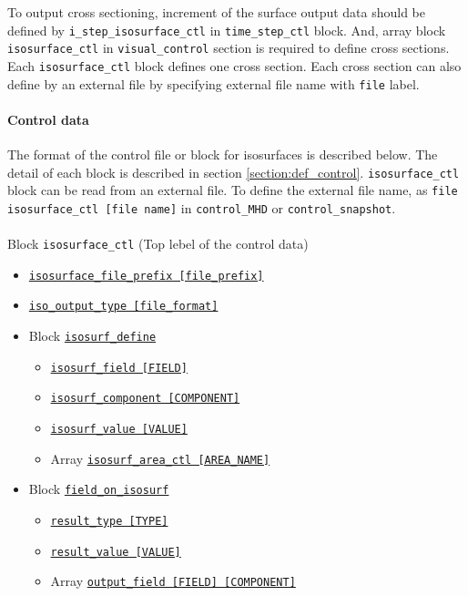 To output cross sectioning, increment of the surface output data should be defined by \verb|i_step_isosurface_ctl| in \verb|time_step_ctl| block. And, array block \verb|isosurface_ctl| in \verb|visual_control| section is required to define cross sections. Each \verb|isosurface_ctl| block defines one cross section. Each cross section can also define by an external file by specifying external file name with \verb|file| label.
%
\paragraph{Control data}  \label{section:isosurface_control}
The format of the control file or block for isosurfaces is described below. The detail of each block is described in section \ref{section:def_control}.  \verb|isosurface_ctl| block can be read from an external file. To define the external file name, as \verb|file isosurface_ctl [file name]| in \verb|control_MHD| or \verb|control_snapshot|. \\
\\
%
Block \verb|isosurface_ctl|  (Top lebel of the control data)
\label{href_i:isosurface_ctl}
\begin{itemize}
	\item \hyperref[href_t:isosurface_file_prefix]
			{\tt isosurface\_file\_prefix    [file\_prefix]}
	\item \hyperref[href_t:iso_output_type]
			{\tt iso\_output\_type           [file\_format]}
%
	\item Block \hyperref[href_t:isosurf_define]{\tt isosurf\_define}
		\begin{itemize}
			\item \hyperref[href_t:isosurf_field]{\tt isosurf\_field    [FIELD]}
			\item \hyperref[href_t:isosurf_component]
						{\tt isosurf\_component    [COMPONENT]}
			\item \hyperref[href_t:isosurf_value]{\tt isosurf\_value    [VALUE]}
%
			\item Array \hyperref[href_t:isosurf_area_ctl]
						{\tt isosurf\_area\_ctl  [AREA\_NAME]}
		\end{itemize}
%
	\item Block \hyperref[href_t:field_on_isosurf]{\tt field\_on\_isosurf}
		\begin{itemize}
			\item \hyperref[href_t:result_type]{\tt result\_type    [TYPE]}
			\item \hyperref[href_t:result_value]{\tt result\_value    [VALUE]}
			\item Array \hyperref[href_t:iso_output_field]
						{\tt output\_field        [FIELD]    [COMPONENT]}
		\end{itemize}
\end{itemize}

